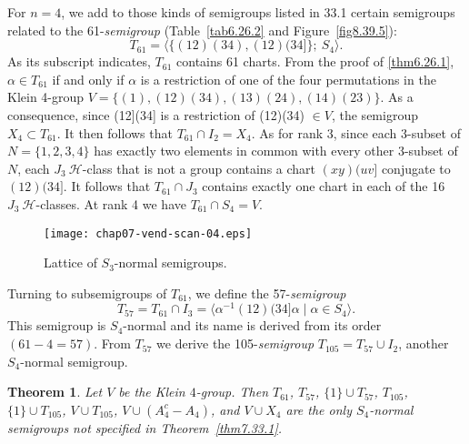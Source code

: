 \documentclass{surv-l}
\numberwithin{equation}{section}
\numberwithin{table}{section}
\numberwithin{figure}{section}
\newtheorem{theorem}[equation]{Theorem}
\theoremstyle{definition}
\begin{document}
For $n =4$, we add to those kinds of semigroups listed in 33.1
certain semigroups related to the 61-\emph{semigroup}
(Table~\ref{tab6.26.2} and Figure~\ref{fig8.39.5}):
\[
T_{61}=\langle\{(12)(34), (12)(34]\};\ S_{4}\rangle.
\]
As its subscript indicates, $T_{61}$ contains 61 charts. From the
proof of \ref{thm6.26.1}, $\alpha\in T_{61}$ if and only if
$\alpha$ is a restriction of one of the four permutations in the
Klein 4-group $V=\{(1),(12) (34),(13)(24),(14)(23)\}$. As a
consequence, since (12](34] is a restriction of (12)(34) $\in V$,
the semigroup $X_{4}\subset T_{61}$. It then follows that
$T_{61}\cap I_{2}=X_{4}$. As for rank 3, since each 3-subset of
$N=\{1,2,3,4\}$ has exactly two elements in common with every
other 3-subset of $N$, each $J_{3}\ \mathcal{H}$-class that is not a
group contains a chart $(xy)(uv]$ conjugate to $(12)(34]$. It
follows that $T_{61}\cap J_{3}$ contains exactly one chart in each
of the 16 $J_{3}\ \mathcal{H}$-classes. At rank 4 we have
$T_{61}\cap S_{4}= V$.

\begin{figure}[!h]
\texttt{[image: chap07-vend-scan-04.eps]}
\caption{Lattice of $S_{3}$-normal semigroups.\label{fig7.34.1}}
\end{figure}

Turning to subsemigroups of $T_{61}$, we
define the 57-\emph{semigroup}
\[
 T_{57}=T_{61}\cap I_{3}=\langle\alpha^{-1}(12)(34]\alpha\mid \alpha\in S_{4}\rangle.
\]
This semigroup is $S_{4}$-normal and its name is derived from its
order $(61-4= 57)$. From $T_{57}$ we derive the
105-\emph{semigroup} $T_{105}=T_{57}\cup
I_{2}$, another $S_{4}$-normal
semigroup.

\setcounter{equation}{1}
\begin{theorem}\label{thm7.34.2}
Let $V$ be the Klein $4$-group. Then $T_{61}$, $T_{57}$, $\{1\}\cup
T_{57}$, $T_{105}$, $\{1\}\cup T_{105}$, $V\cup T_{105}$, $V\cup
(A_{4}^{c}-A_{4})$, and $V\cup X_{4}$ are the only $S_{4}$-normal
semigroups not specified in \emph{Theorem~\ref{thm7.33.1}}.
\end{theorem}
\end{document}
